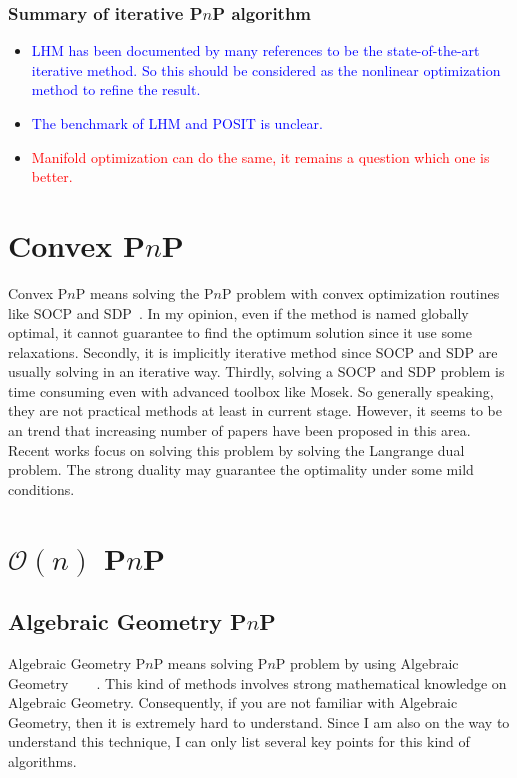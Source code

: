 \documentclass[a4paper]{report}
\begin{document}
\subsubsection{Summary of iterative P$n$P algorithm}
\begin{itemize}
\item \textcolor{blue}{LHM has been documented by many references to be the state-of-the-art iterative method. So this should be considered as the nonlinear optimization method to refine the result.}
\item \textcolor{blue}{The benchmark of LHM and POSIT is unclear.}
\item \textcolor{red}{Manifold optimization can do the same, it remains a question which one is better.}
\end{itemize}

\section{Convex P$n$P}
Convex P$n$P means solving the P$n$P problem with convex optimization routines like SOCP and SDP~\cite{schweighofer2008globally}. In my opinion, even if the method is named globally optimal, it cannot guarantee to find the optimum solution since it use some relaxations. Secondly, it is implicitly iterative method since SOCP and SDP are usually solving in an iterative way. Thirdly, solving a SOCP and SDP problem is time consuming even with advanced toolbox like Mosek. So generally speaking, they are not practical methods at least in current stage. However, it seems to be an trend that increasing number of papers have been proposed in this area. Recent works focus on solving this problem by solving the Langrange dual problem. The strong duality may guarantee the optimality under some mild conditions.

\section{$\mathcal{O}(n)$ P$n$P}
\subsection{Algebraic Geometry P$n$P}
Algebraic Geometry P$n$P means solving P$n$P problem by using Algebraic Geometry~\cite{zheng2013revisiting}~\cite{hesch2011direct}~\cite{kneip2014upnp}~\cite{zheng2013aspnp}\cite{triggs1999camera}. This kind of methods involves strong mathematical knowledge on Algebraic Geometry. Consequently, if you are not familiar with Algebraic Geometry, then it is extremely hard to understand. Since I am also on the way to understand this technique, I can only list several key points for this kind of algorithms.
\end{document}
